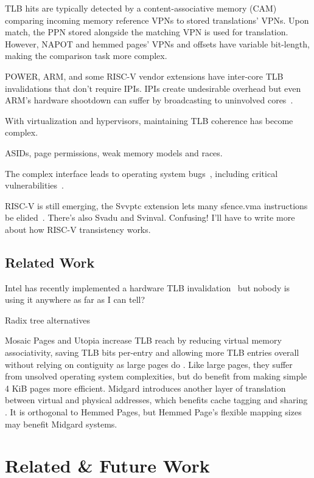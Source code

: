 TLB hits are typically detected by a content-associative memory (CAM) comparing incoming memory reference VPNs to stored translations' VPNs. Upon match, the PPN stored alongside the matching VPN is used for translation. However, NAPOT and hemmed pages' VPNs and offsets have variable bit-length, making the comparison task more complex.

POWER, ARM, and some RISC-V vendor extensions have inter-core TLB invalidations that don't require IPIs. IPIs create undesirable overhead but even ARM's hardware shootdown can suffer by broadcasting to uninvolved cores~\cite{takao_indoh_patch_2019}.

With virtualization and hypervisors, maintaining TLB coherence has become complex.

ASIDs, page permissions, weak memory models and races.

The complex interface leads to operating system bugs~\cite{wong_tlb_2015}, including critical vulnerabilities~\cite{horn_project_2019}.

RISC-V is still emerging, the Svvptc extension lets many sfence.vma instructions be elided~\cite{ghiti_patch_2024}. There's also Svadu and Svinval. Confusing! I'll have to write more about how RISC-V transistency works.

\subsection{Related Work}

Intel has recently implemented a hardware TLB invalidation~\cite{intel_corporation_remote_2021} but nobody is using it anywhere as far as I can tell?

Radix tree alternatives 

Mosaic Pages and Utopia increase TLB reach by reducing virtual memory associativity, saving TLB bits per-entry and allowing more TLB entries overall without relying on contiguity as large pages do \cite{gosakan_mosaic_2023, kanellopoulos_utopia_2023}. Like large pages, they suffer from unsolved operating system complexities, but do benefit from making simple 4 KiB pages more efficient. Midgard introduces another layer of translation between virtual and physical addresses, which benefits cache tagging and sharing \cite{gupta_rebooting_2021}. It is orthogonal to Hemmed Pages, but Hemmed Page's flexible mapping sizes may benefit Midgard systems.


\section{Related \& Future Work}

